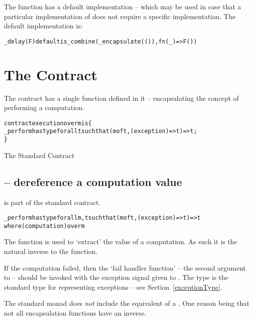 The  function has a default implementation -- which may be used in case that a particular implementation of  does not require a specific implementation. The default implementation is:
\begin{alltt}
_delay(F) default is _combine(_encapsulate(()),fn(_) => F())
\end{alltt}

\section{The  Contract}
\label{execution}

The  contract has a single function defined in it -- encapsulating the concept of performing a computation.

\begin{program}
\begin{alltt}
contract execution over m is \{
  _perform has type for all t such that (m of t, (exception)=>t) => t;
\}
\end{alltt}
\caption{The Standard  Contract\label{executionContractProg}}
\end{program}

\subsection{ -- dereference a computation value}
\label{performFunction}
 is part of the standard  contract.
\begin{alltt}
\_perform has type for all m,t such that (m of t, (exception)=>t)=>t
                   where (computation) over m
\end{alltt}
The  function is used to `extract' the value of a computation. As such it is the natural inverse to the  function.

If the computation failed, then the `fail handler function' -- the second argument to  -- should be invoked with the exception signal given to . The  type is the standard type for representing exceptions -- see Section~\vref{exceptionType}.

\begin{aside}
The standard monad does \emph{not} include the equivalent of a . One reason being that not all encapsulation functions have an inverse.
\end{aside}

